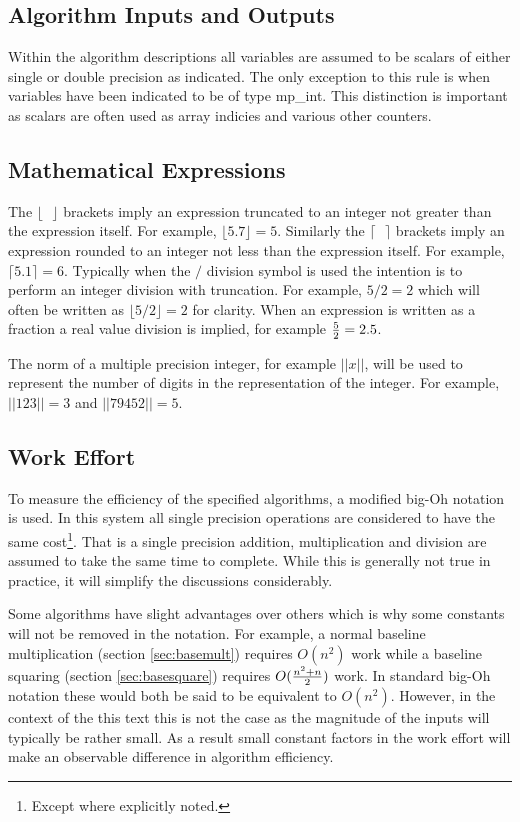 \documentclass[b5paper]{book}
\begin{document}
\subsection{Algorithm Inputs and Outputs}
Within the algorithm descriptions all variables are assumed to be scalars of either single or double precision
as indicated.  The only exception to this rule is when variables have been indicated to be of type mp\_int.  This 
distinction is important as scalars are often used as array indicies and various other counters.  

\subsection{Mathematical Expressions}
The $\lfloor \mbox{ } \rfloor$ brackets imply an expression truncated to an integer not greater than the expression 
itself.  For example, $\lfloor 5.7 \rfloor = 5$.  Similarly the $\lceil \mbox{ } \rceil$ brackets imply an expression
rounded to an integer not less than the expression itself.  For example, $\lceil 5.1 \rceil = 6$.  Typically when 
the $/$ division symbol is used the intention is to perform an integer division with truncation.  For example, 
$5/2 = 2$ which will often be written as $\lfloor 5/2 \rfloor = 2$ for clarity.  When an expression is written as a 
fraction a real value division is implied, for example ${5 \over 2} = 2.5$.  

The norm of a multiple precision integer, for example $\vert \vert x \vert \vert$, will be used to represent the number of digits in the representation
of the integer.  For example, $\vert \vert 123 \vert \vert = 3$ and $\vert \vert 79452 \vert \vert = 5$.  

\subsection{Work Effort}
To measure the efficiency of the specified algorithms, a modified big-Oh notation is used.  In this system all 
single precision operations are considered to have the same cost\footnote{Except where explicitly noted.}.  
That is a single precision addition, multiplication and division are assumed to take the same time to 
complete.  While this is generally not true in practice, it will simplify the discussions considerably.

Some algorithms have slight advantages over others which is why some constants will not be removed in 
the notation.  For example, a normal baseline multiplication (section \ref{sec:basemult}) requires $O(n^2)$ work while a 
baseline squaring (section \ref{sec:basesquare}) requires $O({{n^2 + n}\over 2})$ work.  In standard big-Oh notation these 
would both be said to be equivalent to $O(n^2)$.  However, 
in the context of the this text this is not the case as the magnitude of the inputs will typically be rather small.  As a 
result small constant factors in the work effort will make an observable difference in algorithm efficiency.
\end{document}
